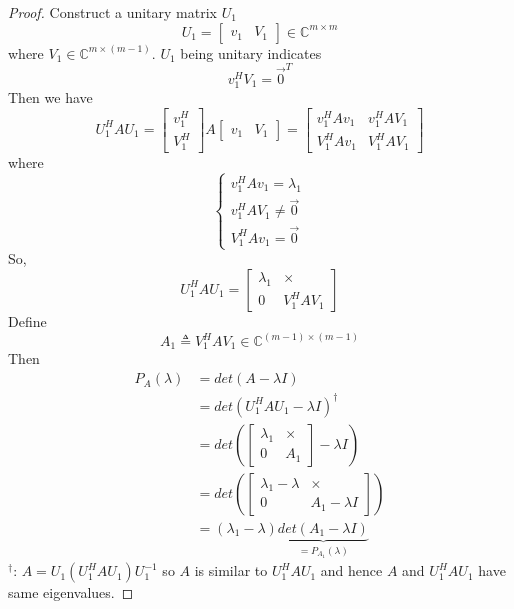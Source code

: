\begin{multicols}{2}
\begin{proof}
    Construct a unitary matrix $U_1$
    \[
        U_1 = \begin{bmatrix}v_1 & V_1\end{bmatrix} \in\mathbb{C}^{m\times m} 
    \]
    where $V_1\in\mathbb{C}^{m\times (m-1)}$. $U_1$ being unitary indicates \[v_1^HV_1=\overrightarrow{0}^T\]
    Then we have 
    \[
        U_1^HAU_1 = \begin{bmatrix} v_1^H \\ V_1^H \end{bmatrix} A \begin{bmatrix} v_1 & V_1 \end{bmatrix} 
        = \begin{bmatrix}
            v_1^HAv_1 & v_1^HAV_1 \\
            V_1^HAv_1 & V_1^HAV_1
        \end{bmatrix}
    \]
    where 
    \[
        \left\{\begin{array}{l}
            v_1^HAv_1=\lambda_1 \\
            v_1^HAV_1 \neq \overrightarrow{0} \\
            V_1^HAv_1 = \overrightarrow{0}
        \end{array}\right.
    \]
    So,
    \[
        U_1^HAU_1 = \begin{bmatrix}
            \lambda_1 & \times \\
            0 & V_1^HAV_1
        \end{bmatrix}
    \]
    Define
    \[
        A_1 \triangleq V_1^HAV_1 \in \mathbb{C}^{(m-1)\times (m-1)}
    \]
    Then
    \[
        \begin{array}{ll}
            P_{A}(\lambda) & = det(A-\lambda I) \\
            & = det(U_1^HAU_1-\lambda I)^\dagger  \\ 
            & = det\left(\begin{bmatrix}
                \lambda_1 & \times \\
                0 & A_1
            \end{bmatrix}-\lambda I\right) \\
            & = det\left(\begin{bmatrix}
                \lambda_1-\lambda & \times \\
                0 & A_1-\lambda I
            \end{bmatrix}\right) \\
            & = (\lambda_1-\lambda)\underbrace{det(A_1-\lambda I)}_{=P_{A_1}(\lambda)}
        \end{array}
    \]
    $^\dagger$: $A=U_1(U_1^HAU_1)U_1^{-1}$ so $A$ is similar to $U_1^HAU_1$ and hence $A$ and $U_1^HAU_1$
    have same eigenvalues.


\end{proof}
\end{multicols}
